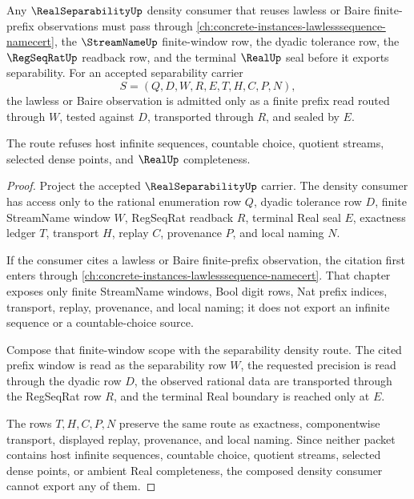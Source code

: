 \begin{theorem}
\label{thm:real-separability-lawless-sequence-forward-link}
Any $\RealSeparabilityUp$ density consumer that reuses lawless or Baire finite-prefix observations must pass through \autoref{ch:concrete-instances-lawlesssequence-namecert}, the $\StreamNameUp$ finite-window row, the dyadic tolerance row, the $\RegSeqRatUp$ readback row, and the terminal $\RealUp$ seal before it exports separability. For an accepted separability carrier
$$
S=(Q,D,W,R,E,T,H,C,P,N),
$$
the lawless or Baire observation is admitted only as a finite prefix read routed through $W$, tested against $D$, transported through $R$, and sealed by $E$.

The route refuses host infinite sequences, countable choice, quotient streams, selected dense points, and $\RealUp$ completeness.
\end{theorem}
\begin{proof}
Project the accepted $\RealSeparabilityUp$ carrier. The density consumer has access only to the rational enumeration row $Q$, dyadic tolerance row $D$, finite StreamName window $W$, RegSeqRat readback $R$, terminal Real seal $E$, exactness ledger $T$, transport $H$, replay $C$, provenance $P$, and local naming $N$.

If the consumer cites a lawless or Baire finite-prefix observation, the citation first enters through \autoref{ch:concrete-instances-lawlesssequence-namecert}. That chapter exposes only finite StreamName windows, Bool digit rows, Nat prefix indices, transport, replay, provenance, and local naming; it does not export an infinite sequence or a countable-choice source.

Compose that finite-window scope with the separability density route. The cited prefix window is read as the separability row $W$, the requested precision is read through the dyadic row $D$, the observed rational data are transported through the RegSeqRat row $R$, and the terminal Real boundary is reached only at $E$.

The rows $T,H,C,P,N$ preserve the same route as exactness, componentwise transport, displayed replay, provenance, and local naming. Since neither packet contains host infinite sequences, countable choice, quotient streams, selected dense points, or ambient Real completeness, the composed density consumer cannot export any of them.
\end{proof}
